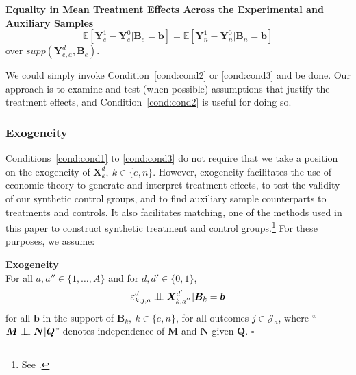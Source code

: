 \onehalfspacing
\begin{condition} \textbf{Equality in Mean Treatment Effects Across the Experimental and Auxiliary Samples \label{cond:cond3}}
\begin{equation}
\mathbb{E} \left[ \bm{Y}_e^1 - \bm{Y}_e^0 | \bm{B}_e = \bm{b} \right] = \mathbb{E} \left[ \bm{Y}_n^1 - \bm{Y}_n^0 | \bm{B}_n = \bm{b} \right]
\end{equation}
over $supp\left(\bm{Y}^d_{e,a}, \bm{B}_e\right)$.\footnotemark
\end{condition}
\doublespacing
We could simply invoke Condition~\ref{cond:cond2} or \ref{cond:cond3} and be done. Our approach is to examine and test (when possible) assumptions that justify the treatment effects, and Condition~\ref{cond:cond2} is useful for doing so.

\subsubsection{Exogeneity}

Conditions~\ref{cond:cond1} to \ref{cond:cond3} do not require that we take a position on the exogeneity of $\bm{X}^d_k, \: k \in \{e,n\}$. However, exogeneity facilitates the use of economic theory to generate and interpret treatment effects, to test the validity of our synthetic control groups, and to find auxiliary sample counterparts to treatments and controls. It also facilitates matching, one of the methods used in this paper to construct synthetic treatment and control groups.\footnote{See \cite{Heckman_Navarro_2004_REStat}.} For these purposes, we assume:

\onehalfspacing
\begin{assumption}\label{ass:exog} \textbf{Exogeneity}\\
For all $a, a'' \in \{ 1, \ldots, A \}$ and for $d, d' \in \{0,1\}$,
\begin{equation}
\varepsilon^d_{k,j,a} \perp\!\!\!\perp \bm{X}^{d^{\prime}}_{k,a^{''}} | \bm{B}_k = \bm{b}
\end{equation}
for all $\bm{b}$ in the support of $\bm{B}_k, \: k \in \{e,n\}$, for all outcomes $j \in \mathcal{J}_{a}$, where ``$\bm{M} \perp\!\!\!\perp \bm{N}|\bm{Q}$'' denotes independence of $\bm{M}$ and $\bm{N}$ given $\bm{Q}$. $\square$
\end{assumption}
\doublespacing

